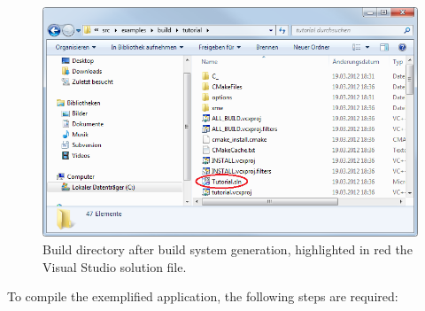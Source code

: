 \begin{enumerate}
\begin{figure}[htpb]
	\centering
	\includegraphics[scale=0.75]{figures/PNG/build_directory_edited.png}
	\caption{Build directory after build system generation, highlighted in red the Visual Studio solution file.}
	\label{fig:build_directory}
\end{figure}

\end{enumerate}

\noindent To compile the exemplified application, the following steps are required:

